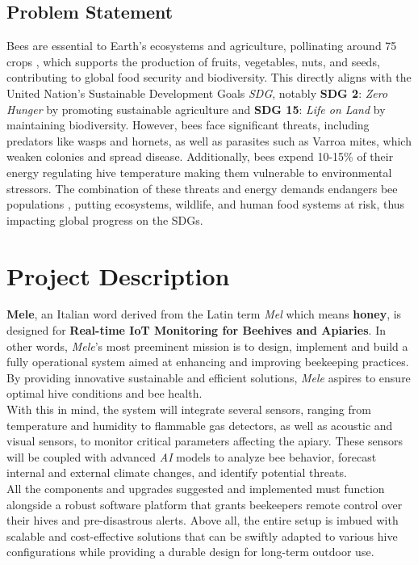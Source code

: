 \documentclass[12pt]{article}
\begin{document}
	\subsection{Problem Statement}
	Bees are essential to Earth's ecosystems and agriculture, pollinating around 75%
	crops \cite{honeypercent}, which supports the production of fruits, vegetables, nuts, and seeds, contributing to global food 
	security and biodiversity. This directly aligns with the United Nation's Sustainable Development Goals \textit{SDG}, notably  \textbf{SDG 2}: \textit{Zero Hunger} \cite{feketene2023evaluation} by promoting sustainable
	agriculture and \textbf{SDG 15}: \textit{Life on Land} \cite{levenson2022pollinator} by maintaining biodiversity. However, bees face significant
	threats, including predators like wasps and hornets, as well as parasites such as Varroa mites, which weaken
	colonies and spread disease. Additionally, bees expend 10-15\% of their energy regulating hive temperature 
	making them vulnerable to environmental stressors. The combination of these threats and energy demands
	endangers bee populations \cite{weinberg2023organizational}, putting ecosystems, wildlife, and human food systems at risk, thus impacting global
	progress on the SDGs.
	\section{Project Description}
	\textbf{Mele}, an Italian word derived from the Latin term \textit{Mel} which means \textbf{honey}, is designed for \textbf{Real-time IoT Monitoring for Beehives and Apiaries}. In other words, \textit{Mele}'s most preeminent mission is to design, implement and build a fully operational system aimed at enhancing and improving beekeeping practices. By providing innovative sustainable and efficient solutions, \textit{Mele} aspires to ensure optimal hive conditions and bee health. \\ \newline
	With this in mind, the system will integrate several sensors, ranging from temperature and humidity to flammable gas detectors, as well as acoustic and visual sensors, to monitor critical parameters affecting the apiary. These sensors will be coupled with advanced \textit{AI} models to analyze bee behavior, forecast internal and external climate changes, and identify potential threats. \\ \newline
	All the components and upgrades suggested and implemented must function alongside a robust software platform that grants beekeepers remote control over their hives and pre-disastrous alerts. Above all, the entire setup is imbued with scalable and cost-effective solutions that can be swiftly adapted to various hive configurations while providing a durable design for long-term outdoor use.
	\vspace{0.5 cm}
\end{document}
